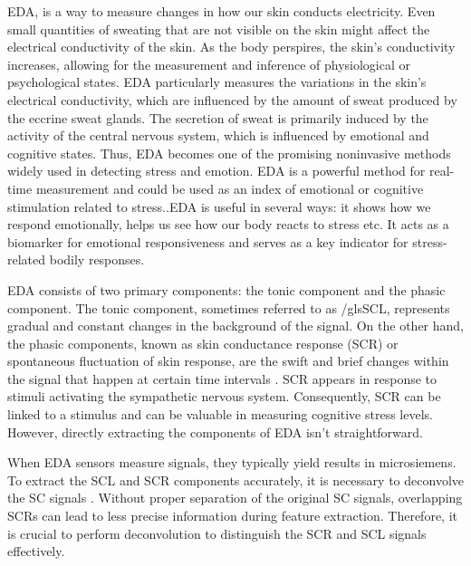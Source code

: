 \gls{EDA}, is a way to measure changes in how our skin conducts electricity. Even small quantities of sweating that are not visible on the skin might affect the electrical conductivity of the skin. As the body perspires, the skin's conductivity increases, allowing for the measurement and inference of physiological or psychological states.
EDA  particularly measures the variations in the skin's electrical conductivity, which are influenced by the amount of sweat produced by the eccrine sweat glands. The secretion of sweat is primarily induced by the activity of the central nervous system, which is influenced by emotional and cognitive states\parencite{eda23}. Thus, EDA becomes one of the promising noninvasive methods widely used in detecting stress and emotion. EDA is a powerful method for real-time measurement and could be used as an index of emotional or cognitive stimulation related to stress.\parencite{gellman2020behavioral}.EDA is useful in several ways: it shows how we respond emotionally, helps us see how our body reacts to stress etc. It acts as a biomarker for emotional responsiveness and serves as a key indicator for stress-related bodily responses. 

\gls{EDA} consists of two primary components: the tonic component and the phasic component. The tonic component, sometimes referred to as /gls{SCL}, represents gradual and constant changes in the background of the signal. On the other hand, the phasic components, known as skin conductance response (SCR) or spontaneous fluctuation of skin response, are the swift and brief changes within the signal that happen at certain time intervals \parencite*{hernando2017feature}. SCR appears in response to stimuli activating the sympathetic nervous system. Consequently, SCR can be linked to a stimulus and can be valuable in measuring cognitive stress levels. However, directly extracting the components of EDA isn't straightforward.

When EDA sensors measure  signals, they typically yield results in microsiemens. To extract the SCL and SCR components accurately, it is necessary to deconvolve the SC signals \parencite{alexander2005separating}. Without proper separation of the original SC signals, overlapping SCRs can lead to less precise information during feature extraction. Therefore, it is crucial to perform deconvolution to distinguish the SCR and SCL signals effectively.

